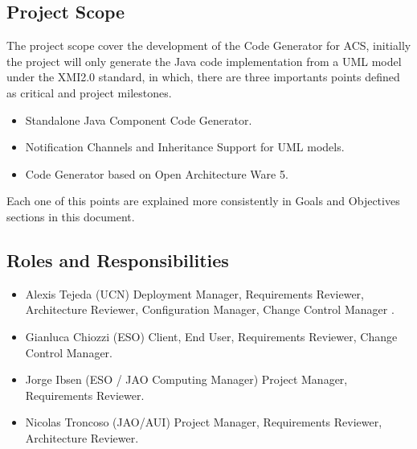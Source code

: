 \subsection{Project Scope}
The project scope cover the development of the Code Generator for ACS,
initially the project will only generate the Java code implementation from a
UML model under the XMI2.0 standard, in which, there are three importants
points defined as critical and project milestones.

\begin{itemize}
	\item Standalone Java Component Code Generator.
	\item Notification Channels and Inheritance Support for UML models.
	\item Code Generator based on Open Architecture Ware 5.
\end{itemize}
Each one of this points are explained more consistently in Goals and Objectives
sections in this document.

\subsection{Roles and Responsibilities}
\begin{itemize}
\item Alexis Tejeda (UCN) Deployment Manager, Requirements Reviewer,
Architecture Reviewer, Configuration Manager, Change Control Manager . 
\item Gianluca Chiozzi (ESO) Client, End User, Requirements Reviewer, Change
Control Manager.
\item Jorge Ibsen (ESO / JAO Computing Manager) Project Manager, Requirements
Reviewer.
\item Nicolas Troncoso (JAO/AUI) Project Manager, Requirements Reviewer,
Architecture Reviewer.
\end{itemize}

\newpage









